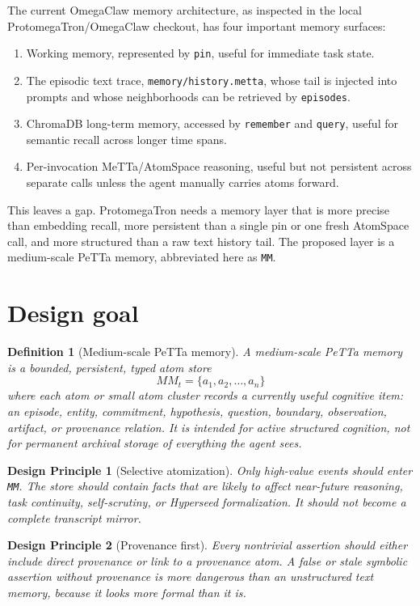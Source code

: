 \documentclass[11pt]{article}
\newtheorem{definition}{Definition}
\newtheorem{principle}{Design Principle}
\begin{document}
The current OmegaClaw memory architecture, as inspected in the local
ProtomegaTron/OmegaClaw checkout, has four important memory surfaces:
\begin{enumerate}
  \item Working memory, represented by \texttt{pin}, useful for immediate task state.
  \item The episodic text trace, \texttt{memory/history.metta}, whose tail is injected
        into prompts and whose neighborhoods can be retrieved by \texttt{episodes}.
  \item ChromaDB long-term memory, accessed by \texttt{remember} and \texttt{query},
        useful for semantic recall across longer time spans.
  \item Per-invocation MeTTa/AtomSpace reasoning, useful but not persistent across
        separate calls unless the agent manually carries atoms forward.
\end{enumerate}

This leaves a gap.  ProtomegaTron needs a memory layer that is more precise than
embedding recall, more persistent than a single pin or one fresh AtomSpace call,
and more structured than a raw text history tail.  The proposed layer is a
medium-scale PeTTa memory, abbreviated here as \texttt{MM}.

\section{Design goal}

\begin{definition}[Medium-scale PeTTa memory]
A medium-scale PeTTa memory is a bounded, persistent, typed atom store
\[
  MM_t = \{ a_1, a_2, \ldots, a_n \}
\]
where each atom or small atom cluster records a currently useful cognitive item:
an episode, entity, commitment, hypothesis, question, boundary, observation,
artifact, or provenance relation.  It is intended for active structured cognition,
not for permanent archival storage of everything the agent sees.
\end{definition}

\begin{principle}[Selective atomization]
Only high-value events should enter \texttt{MM}.  The store should contain facts
that are likely to affect near-future reasoning, task continuity, self-scrutiny,
or Hyperseed formalization.  It should not become a complete transcript mirror.
\end{principle}

\begin{principle}[Provenance first]
Every nontrivial assertion should either include direct provenance or link to a
provenance atom.  A false or stale symbolic assertion without provenance is more
dangerous than an unstructured text memory, because it looks more formal than it is.
\end{principle}
\end{document}
